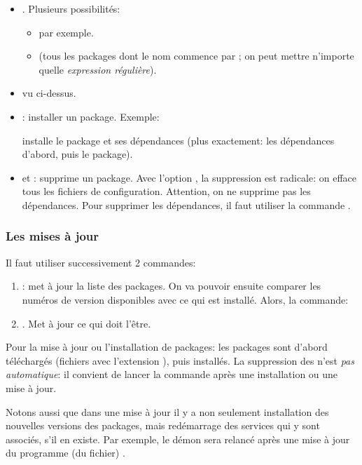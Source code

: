 \begin{itemize}
\item {}. Plusieurs possibilités:
  \begin{itemize}
  \item {} par exemple.
  \item {} (tous les packages dont le nom
    commence par ; on peut mettre n'importe quelle
    \emph{expression régulière}).
  \end{itemize}
\item {} vu ci-dessus.
\item {}: installer un package. Exemple:
  \begin{center}
  \end{center}
  installe le package et ses dépendances (plus exactement: les
  dépendances d'abord, puis le package).
\item {} et : supprime un package. Avec
  l'option , la suppression est radicale: on efface tous
    les fichiers de configuration. Attention, on ne supprime pas les
    dépendances. Pour supprimer les dépendances, il faut utiliser la
    commande .
\end{itemize}
\subsubsection{Les mises à jour}
Il faut utiliser successivement 2 commandes:

\begin{enumerate}
\item {}: met à jour la liste des packages. On va
  pouvoir ensuite comparer les numéros de version disponibles avec ce
  qui est installé. Alors, la commande:
\item   {}. Met à jour ce qui doit l'être.
\end{enumerate}

Pour la  mise à jour ou l'installation de packages: les packages sont
d'abord téléchargés (fichiers avec l'extension ), puis
installés. La suppression des   n'est \emph{pas
  automatique}:
il convient de lancer la commande  après une
installation ou une mise à jour.

Notons aussi que dans une mise à jour il y a non seulement
installation des nouvelles versions des packages, mais redémarrage des
services qui y sont associés, s'il en existe. Par exemple, le démon
 sera relancé après une mise à jour du programme (du
fichier) .


